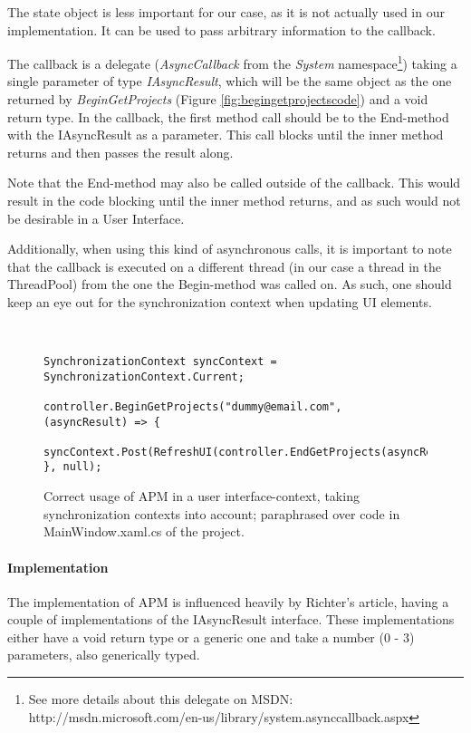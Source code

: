 The state object is less important for our case, as it is not actually used in our implementation. It can be used
to pass arbitrary information to the callback.

The callback is a delegate (\emph{AsyncCallback} from the \emph{System} namespace\footnote{See more details about this delegate on MSDN: http://msdn.microsoft.com/en-us/library/system.asynccallback.aspx})
taking a single parameter of type \emph{IAsyncResult}, which will be the same object as the one
returned by \emph{BeginGetProjects} (Figure \ref{fig:begingetprojectscode}) and a void return type.
In the callback, the first method call should be to the End-method with the IAsyncResult
as a parameter. This call blocks until the inner method returns and then passes the result along.

Note that the End-method may also be called outside of the callback. This would result in the code
blocking until the inner method returns, and as such would not be desirable in a User Interface.

Additionally, when using this kind of asynchronous calls, it is important to note that the callback
is executed on a different thread (in our case a thread in the ThreadPool) from the one the Begin-method
was called on. As such, one should keep an eye out for the synchronization context when updating UI
elements.\cite[p.~622]{Griffiths2010}

\begin{figure}[hbt]
    \begin{verbatim}
    
    
SynchronizationContext syncContext = SynchronizationContext.Current;

controller.BeginGetProjects("dummy@email.com", (asyncResult) => {
    syncContext.Post(RefreshUI(controller.EndGetProjects(asyncResult)))
}, null);\end{verbatim}
\caption{Correct usage of APM in a user interface-context, taking synchronization contexts into account; paraphrased over code in MainWindow.xaml.cs of the \SOP{} project.}
    \label{fig:apmuserinterfacecode}
\end{figure}

\paragraph{Implementation}

The \SOP{} implementation of APM is influenced heavily by Richter's article, having a couple of
implementations of the IAsyncResult interface. These implementations either have a void return type
or a generic one and take a number (0 - 3) parameters, also generically typed.

